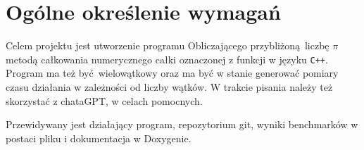 	\newpage
\section{Ogólne określenie wymagań}		%

\hspace{0.60cm}

Celem projektu jest utworzenie programu Obliczającego przybliżoną liczbę $\pi$ metodą całkowania numerycznego całki oznaczonej z funkcji w języku \texttt{C++}. Program ma też być wielowątkowy oraz ma być w stanie generować pomiary czasu działania w zależności od liczby wątków. W trakcie pisania należy też skorzystać z chataGPT, w celach pomocnych.

Przewidywany jest działający program, repozytorium git, wyniki benchmarków w postaci pliku i dokumentacja w Doxygenie.

